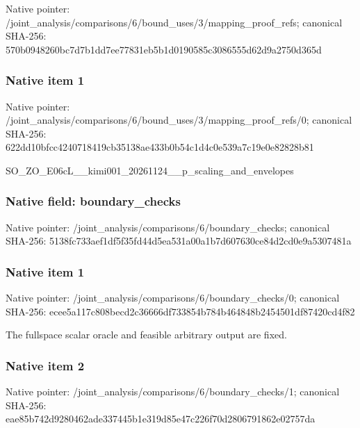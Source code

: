 \documentclass[10pt,a4paper]{article}
\begin{document}
Native pointer: /joint\_analysis/comparis\allowbreak{}ons/6/bound\_uses/3/mappi\allowbreak{}ng\_proof\_refs; canonical SHA-256: 570b0948260bc7d7b1dd7ee7\allowbreak{}7831eb5b1d0190585c308655\allowbreak{}5d62d9a2750d365d



\subsubsection{Native item 1}


Native pointer: /joint\_analysis/comparis\allowbreak{}ons/6/bound\_uses/3/mappi\allowbreak{}ng\_proof\_refs/0; canonical SHA-256: 622dd10bfcc4240718419cb3\allowbreak{}5138ae433b0b54c1d4c0e539\allowbreak{}a7c19e0e82828b81


SO\_ZO\_E06cL\_\_kimi001\_202\allowbreak{}61124\_\_p\_scaling\_and\_env\allowbreak{}elopes


\subsubsection{Native field: boundary\_checks}


Native pointer: /joint\_analysis/comparis\allowbreak{}ons/6/boundary\_checks; canonical SHA-256: 5138fc733aef1df5f35fd44d\allowbreak{}5ea531a00a1b7d607630ce84\allowbreak{}d2cd0e9a5307481a



\subsubsection{Native item 1}


Native pointer: /joint\_analysis/comparis\allowbreak{}ons/6/boundary\_checks/0; canonical SHA-256: ecee5a117c808becd2c36666\allowbreak{}df733854b784b464848b2454\allowbreak{}501df87420cd4f82


The fullspace scalar oracle and feasible arbitrary output are fixed.


\subsubsection{Native item 2}


Native pointer: /joint\_analysis/comparis\allowbreak{}ons/6/boundary\_checks/1; canonical SHA-256: eae85b742d9280462ade3374\allowbreak{}45b1e319d85e47c226f70d28\allowbreak{}06791862e02757da
\end{document}
